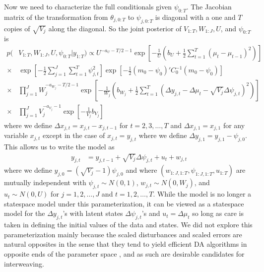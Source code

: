 \documentclass[graybox]{svmult}
\begin{document}
Now we need to characterize the full conditionals given $\psi_{0:T}$. The Jacobian matrix of the transformation from $\theta_{j,0:T}$ to $\psi_{j,0:T}$ is diagonal with a one and $T$ copies of $\sqrt{V_j}$ along the diagonal. So the joint posterior of $V_{1:T},W_{1:J},U$, and $\psi_{0:T}$ is
\begin{align*}
p(&V_{1:T},W_{1:J},U,\psi_{0:T}|y_{1:T}) \propto U^{-a_U-T/2-1}\exp\left[-\frac{1}{U}\left(b_U + \frac{1}{2}\sum_{t=1}^T(\mu_t - \mu_{t-1})^2\right)\right]\\
\times&\exp\left[-\frac{1}{2}\sum_{j=1}^J\sum_{t=1}^T\psi_{j,t}^2\right]\exp\left[-\frac{1}{2}(m_0 - \psi_0)'C_0^{-1}(m_0 - \psi_0)\right]\\
\times& \prod_{j=1}^JW_j^{-a_{W_j}-T/2-1}\exp\left[-\frac{1}{W_j}\left(b_{W_j} + \frac{1}{2}\sum_{t=1}^T\left(\Delta y_{j,t} - \Delta\mu_{t} - \sqrt{V_j}\Delta\psi_{j,t}\right)^2\right)\right]\\
\times& \prod_{j=1}^JV_j^{-a_{V_j}-1}\exp\left[-\frac{1}{V_j}b_{V_j}\right]
\end{align*}
where we define $\Delta x_{j,t}=x_{j,t} - x_{j,t-1}$ for $t=2,3,\dots,T$ and $\Delta x_{j,1} = x_{j,1}$ for any variable $x_{j,t}$ except in the case of $x_{j,t}=y_{j,t}$ where we define $\Delta y_{j,1} = y_{j,1} - \psi_{j,0}$. This allows us to write the model as
\begin{align}
y_{j,t} &= y_{j,t-1} + \sqrt{V_j}\Delta\psi_{j,t} + u_t + w_{j,t} \label{eq:ses}
\end{align}
where we define $y_{j,0}=(\sqrt{V_j}-1)\psi_{j,0}$ and where $(w_{1:J,1:T},\psi_{1:J,1:T},u_{1:T})$ are mutually independent with $\psi_{j,t}\sim N(0,1)$, $w_{j,t}\sim N(0,W_j)$, and $u_t\sim N(0,U)$ for $j=1,2,\dots,J$ and $t=1,2,\dots,T$. While the model is no longer a statespace model under this parameterization, it can be viewed as a statespace model for the $\Delta y_{j,t}$'s with latent states $\Delta \psi_{j,t}$'s and $u_t=\Delta \mu_t$ so long as care is taken in defining the initial values of the data and states. We did not explore this parameterization mainly because the scaled disturbances and scaled errors are natural opposites in the sense that they tend to yield efficient DA algorithms in opposite ends of the parameter space \citep{simpson2014interweaving}, and as such are desirable candidates for interweaving.
\end{document}
